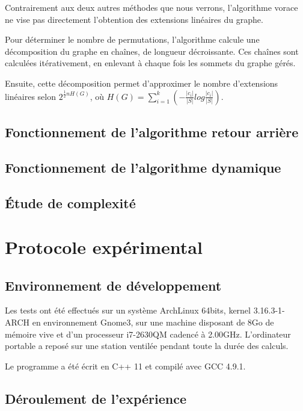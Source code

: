 \documentclass[10pt,a4paper]{article}
\begin{document}
Contrairement aux deux autres méthodes que nous verrons, l'algorithme vorace ne vise pas directement l'obtention des extensions linéaires du graphe. 

Pour déterminer le nombre de permutations, l'algorithme calcule une décomposition du graphe en chaînes, de longueur décroissante. Ces chaînes sont calculées itérativement, en enlevant à chaque fois les sommets du graphe gérés.

Ensuite, cette décomposition permet d'approximer le nombre d'extensions linéaires selon $ 2^{ \frac{1}{2} n H(G)} $, où $ H(G) = \sum_{i=1}^{k} (- \frac{|c_{i}|}{|S|} log \frac{|c_{i}|}{|S|} ) $.

\subsection{Fonctionnement de l'algorithme retour arrière}

\subsection{Fonctionnement de l'algorithme dynamique}

\subsection{Étude de complexité}


\section{Protocole expérimental}

\subsection{Environnement de développement}

Les tests ont été effectués sur un système ArchLinux 64bits, kernel 3.16.3-1-ARCH en environnement Gnome3, sur une machine disposant de 8Go de mémoire vive et d'un processeur i7-2630QM cadencé à 2.00GHz. L'ordinateur portable a reposé sur une station ventilée pendant toute la durée des calculs.

Le programme a été écrit en C++ 11 et compilé avec GCC 4.9.1.

\subsection{Déroulement de l'expérience}
\end{document}
